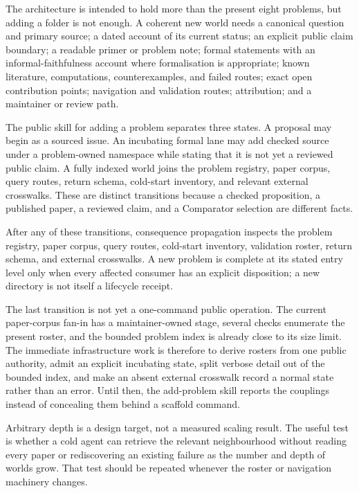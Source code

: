 \documentclass[10pt]{article}
\begin{document}
The architecture is intended to hold more than the present eight problems,
but adding a folder is not enough.  A coherent new world needs a canonical
question and primary source; a dated account of its current status; an explicit
public claim boundary; a readable primer or problem note; formal statements
with an informal-faithfulness account where formalisation is appropriate;
known literature, computations, counterexamples, and failed routes; exact open
contribution points; navigation and validation routes; attribution; and a
maintainer or review path.

The public skill for adding a problem separates three states.  A proposal may
begin as a sourced issue.  An incubating formal lane may add checked source
under a problem-owned namespace while stating that it is not yet a reviewed
public claim.  A fully indexed world joins the problem registry, paper corpus,
query routes, return schema, cold-start inventory, and relevant external
crosswalks.  These are distinct transitions because a checked proposition, a
published paper, a reviewed claim, and a Comparator selection are different
facts.

After any of these transitions, consequence propagation inspects the problem
registry, paper corpus, query routes, cold-start inventory, validation roster,
return schema, and external crosswalks. A new problem is complete at its stated
entry level only when every affected consumer has an explicit disposition; a
new directory is not itself a lifecycle receipt.

The last transition is not yet a one-command public operation.  The current
paper-corpus fan-in has a maintainer-owned stage, several checks enumerate the
present roster, and the bounded problem index is already close to its size
limit.  The immediate infrastructure work is therefore to derive rosters from
one public authority, admit an explicit incubating state, split verbose detail
out of the bounded index, and make an absent external crosswalk record a normal
state rather than an error.  Until then, the add-problem skill reports the
couplings instead of concealing them behind a scaffold command.

Arbitrary depth is a design target, not a measured scaling result.  The useful
test is whether a cold agent can retrieve the relevant neighbourhood without
reading every paper or rediscovering an existing failure as the number and
depth of worlds grow.  That test should be repeated whenever the roster or
navigation machinery changes.
\end{document}
